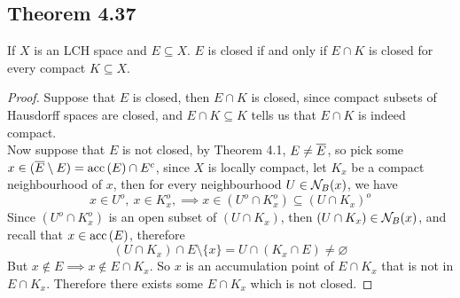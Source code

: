 \documentclass[../../main.tex]{subfiles}
\begin{document}
\subsection{Theorem 4.37}
\begin{wts}
    If $X$ is an LCH space and $E\subseteq X$. $E$ is closed if and only if $E\cap K$ is closed for every compact $K\subseteq X$.
\end{wts}
\begin{proof}
    Suppose that $E$ is closed, then $E\cap K$ is closed, since compact subsets of Hausdorff spaces are closed, and $E\cap K\subseteq K$ tells us that $E\cap K$ is indeed compact.\\
    
    Now suppose that $E$ is not closed, by Theorem 4.1, $E\neq \overline{E}$, so pick some $x\in (\overline{E}\setminus E)=\operatorname{acc}{(E)}\cap E^c$, since $X$ is locally compact, let $K_x$ be a compact neighbourhood of $x$, then for every neighbourhood $U\in\mathcal{N}_B({x})$, we have
    \[
    x\in U^o,\:x\in K_x^o,\implies x\in (U^o\cap K_x^o)\subseteq (U\cap K_x)^o
    \]
    Since $(U^o\cap K_x^o)$ is an open subset of $(U\cap K_x)$, then $(U\cap K_x)\in\mathcal{N}_B({x})$, and recall that $x\in \operatorname{acc}{(E)}$, therefore
    \[
    (U\cap K_x)\cap E\setminus\{x\}=U\cap(K_x\cap E)\neq\varnothing
    \]
    But $x\notin E\implies x\notin E\cap K_x$. So $x$ is an accumulation point of $E\cap K_x$ that is not in $E\cap K_x$. Therefore there exists some $E\cap K_x$ which is not closed.
\end{proof}
\end{document}
